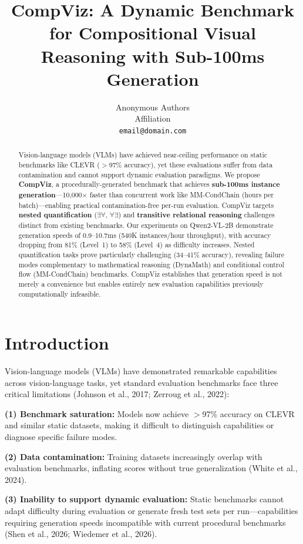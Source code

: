 \documentclass[11pt,a4paper]{article}
\title{\textbf{CompViz: A Dynamic Benchmark for Compositional Visual Reasoning with Sub-100ms Generation}}
\author{Anonymous Authors\\
Affiliation\\
\texttt{email@domain.com}}
\date{}
\begin{document}
\maketitle

\begin{abstract}
\noindent
Vision-language models (VLMs) have achieved near-ceiling performance on static benchmarks like CLEVR ($>$97\% accuracy), yet these evaluations suffer from data contamination and cannot support dynamic evaluation paradigms. We propose \textbf{CompViz}, a procedurally-generated benchmark that achieves \textbf{sub-100ms instance generation}---10,000$\times$ faster than concurrent work like MM-CondChain (hours per batch)---enabling practical contamination-free per-run evaluation. CompViz targets \textbf{nested quantification} ($\exists\forall$, $\forall\exists$) and \textbf{transitive relational reasoning} challenges distinct from existing benchmarks. Our experiments on Qwen2-VL-2B demonstrate generation speeds of 0.9--10.7ms (540K instances/hour throughput), with accuracy dropping from 81\% (Level~1) to 58\% (Level~4) as difficulty increases. Nested quantification tasks prove particularly challenging (34--41\% accuracy), revealing failure modes complementary to mathematical reasoning (DynaMath) and conditional control flow (MM-CondChain) benchmarks. CompViz establishes that generation speed is not merely a convenience but enables entirely new evaluation capabilities previously computationally infeasible.
\end{abstract}

\section{Introduction}

Vision-language models (VLMs) have demonstrated remarkable capabilities across vision-language tasks, yet standard evaluation benchmarks face three critical limitations (Johnson et al., 2017; Zerroug et al., 2022):

\textbf{(1) Benchmark saturation:} Models now achieve $>$97\% accuracy on CLEVR and similar static datasets, making it difficult to distinguish capabilities or diagnose specific failure modes.

\textbf{(2) Data contamination:} Training datasets increasingly overlap with evaluation benchmarks, inflating scores without true generalization (White et al., 2024).

\textbf{(3) Inability to support dynamic evaluation:} Static benchmarks cannot adapt difficulty during evaluation or generate fresh test sets per run---capabilities requiring generation speeds incompatible with current procedural benchmarks (Shen et al., 2026; Wiedemer et al., 2026).
\end{document}

